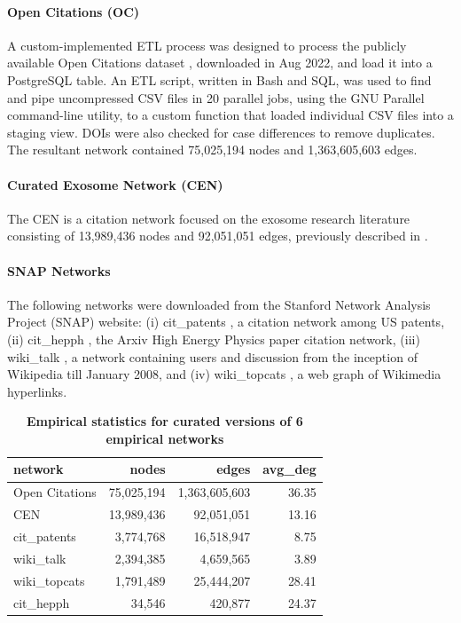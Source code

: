 \documentclass[11pt]{article}   	%
\begin{document}
\paragraph{Open Citations (OC)}
A custom-implemented ETL process was designed to process the publicly available Open Citations dataset \citep{Peroni2020}, downloaded in Aug 2022,  and load it into a PostgreSQL table. An ETL script, written in Bash and SQL, was used to find and pipe uncompressed CSV files in 20 parallel jobs, using the GNU Parallel command-line utility, to a custom function that loaded individual CSV files into a staging view. DOIs were also checked for case differences to remove duplicates.  The resultant network contained 75,025,194 nodes and 1,363,605,603 edges.


\paragraph{Curated Exosome Network (CEN)}
The CEN is a citation network focused on the exosome research literature consisting of 13,989,436 nodes and 92,051,051 edges, previously described in \cite{Jakatdar_2022}.

\paragraph{SNAP Networks}The following networks were downloaded from the Stanford Network Analysis Project (SNAP) website:
 (i) cit\_patents \citep{Leskovec2005}, a citation network among US patents,
(ii) cit\_hepph \citep{Leskovec2005}, the Arxiv High Energy Physics paper citation network,
(iii) wiki\_talk \citep{Leskovec2010}, a network containing users and discussion from the inception of Wikipedia till January 2008,  and
(iv) wiki\_topcats \citep{Yin2017}, a web graph of Wikimedia hyperlinks.

\begin{table}[ht]
\centering
\begin{tabular}{lrrr}
  \hline
 network & nodes & edges & avg\_deg \\
  \hline
  Open Citations &   75,025,194 & 1,363,605,603  &  36.35 \\
  CEN &  13,989,436 &  92,051,051 & 13.16\\ 
  cit\_patents &   3,774,768 & 16,518,947 &   8.75 \\
  wiki\_talk &   2,394,385 & 4,659,565 & 3.89 \\
  wiki\_topcats &   1,791,489 &  25,444,207 & 28.41 \\
  cit\_hepph &   34,546 & 420,877 & 24.37 \\
   \hline
\end{tabular}
\caption{\textbf{Empirical statistics for curated versions of 6 empirical networks}}
\label{tab:empirical-stats-all}
\end{table}
\end{document}
